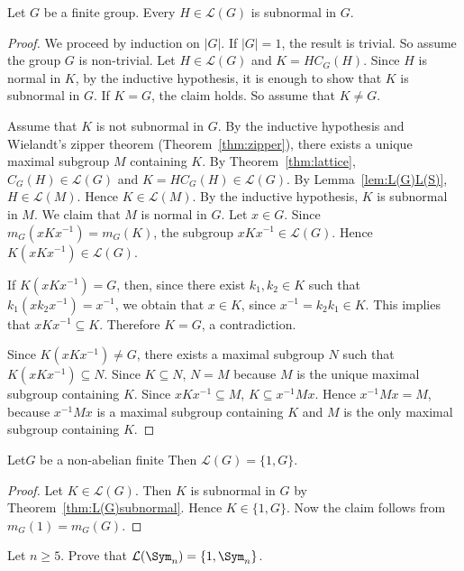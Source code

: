 \begin{theorem}
	\label{thm:L(G)subnormal}
	Let $G$ be a finite group. Every $H\in\mathcal{L}(G)$ is subnormal in $G$.
\end{theorem}

\begin{proof}
	We proceed by induction on $|G|$. If $|G|=1$, the result is trivial. So assume the group $G$ is non-trivial. Let $H\in\mathcal{L}(G)$ and $K=HC_G(H)$. Since $H$ is normal in $K$, by the inductive hypothesis, 
    it is enough to show that 
	$K$ is subnormal in $G$. If $K=G$, the claim holds. So assume that 
	$K\ne G$. 

	Assume that $K$ is not subnormal in $G$. By the inductive hypothesis and 
    Wielandt's zipper theorem (Theorem~\ref{thm:zipper}), there exists a unique 
    maximal subgroup $M$ containing $K$. By Theorem~\ref{thm:lattice},
	$C_G(H)\in\mathcal{L}(G)$ and $K=HC_G(H)\in\mathcal{L}(G)$. By Lemma~\ref{lem:L(G)L(S)},
	$H\in\mathcal{L}(M)$. Hence $K\in\mathcal{L}(M)$. By the inductive hypothesis, $K$ is subnormal in $M$. We claim that $M$ is normal in $G$. Let $x\in G$. Since 
	$m_G(xKx^{-1})=m_G(K)$, the subgroup $xKx^{-1}\in\mathcal{L}(G)$. Hence 
	$K(xKx^{-1})\in\mathcal{L}(G)$. 
	
	If $K(xKx^{-1})=G$, then, since there exist $k_1,k_2\in K$ such that 
	$k_1(xk_2x^{-1})=x^{-1}$, we obtain that $x\in K$, since $x^{-1}=k_2k_1\in K$. This implies that $xKx^{-1}\subseteq K$. Therefore $K=G$, a contradiction.

	Since $K(xKx^{-1})\ne G$, there exists a maximal subgroup $N$ such that 
	$K(xKx^{-1})\subseteq N$. Since $K\subseteq N$, $N=M$ because $M$ is the unique
	maximal subgroup containing $K$. Since $xKx^{-1}\subseteq M$, $K\subseteq
	x^{-1}Mx$. Hence $x^{-1}Mx=M$, because $x^{-1}Mx$ is a maximal subgroup containing $K$ and $M$ is the only maximal subgroup containing $K$. 
\end{proof}

\begin{corollary}
	Let$G$ be a non-abelian finite Then $\mathcal{L}(G)=\{1,G\}$. 
\end{corollary}

\begin{proof}
	Let $K\in\mathcal{L}(G)$. Then $K$ is subnormal in $G$ by Theorem~\ref{thm:L(G)subnormal}. Hence $K\in\{1,G\}$. Now the claim follows from $m_G(1)=m_G(G)$. 
\end{proof}

\begin{exercise}
	Let $n\geq5$. Prove that $\mathcal{L}(\Sym_n)=\{1,\Sym_n\}$. 
\end{exercise}

